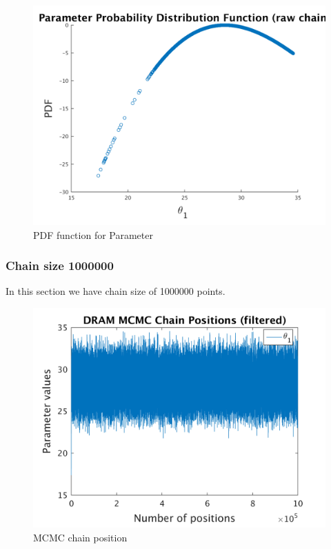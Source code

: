 \begin{figure}[H]
  
  \centering
   \includegraphics[scale=0.75]{53_results/output_900000/ip_logLike_unified}
   \caption{PDF function for Parameter }
\end{figure}


\subsubsection{Chain size 1000000 }
In this section we have chain size of 1000000 points. 

\begin{figure}[H]
  
  \centering
   \includegraphics[scale=0.75]{53_results/output_1000000/simple_ip_chain_pos_filt}
   \caption{MCMC chain position }
\end{figure}


